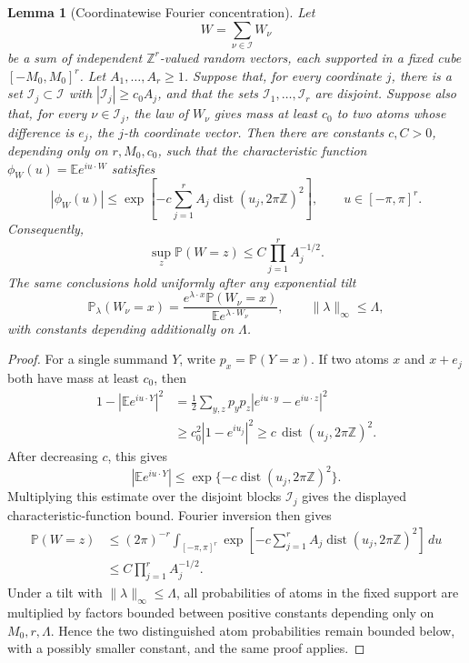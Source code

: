 \documentclass[11pt]{article}
\newtheorem{lemma}[theorem]{Lemma}
\theoremstyle{remark}
\newcommand{\Pp}{\mathbb P}
\newcommand{\Ee}{\mathbb E}
\newcommand{\dd}{\,d}
\begin{document}
\begin{lemma}[Coordinatewise Fourier concentration]\label{lem:coord-fourier}
Let
\[
        W=\sum_{\nu\in\mathcal I}W_\nu
\]
be a sum of independent \(\mathbb Z^r\)-valued random vectors, each supported in a fixed cube \([-M_0,M_0]^r\).  Let
\(A_1,\ldots,A_r\ge1\).  Suppose that, for every coordinate \(j\), there is a set
\(\mathcal I_j\subset\mathcal I\) with
\(|\mathcal I_j|\ge c_0A_j\), and that the sets
\(\mathcal I_1,\ldots,\mathcal I_r\) are disjoint.  Suppose also that, for every
\(\nu\in\mathcal I_j\), the law of \(W_\nu\) gives mass at least \(c_0\) to two atoms whose difference is \(e_j\), the \(j\)-th coordinate vector.  Then there are constants
\(c,C>0\), depending only on \(r,M_0,c_0\), such that the characteristic function
\(\phi_W(u)=\Ee e^{iu\cdot W}\) satisfies
\[
        |\phi_W(u)|
        \le \exp\left[-c\sum_{j=1}^r
        A_j\operatorname{dist}(u_j,2\pi\mathbb Z)^2\right],
        \qquad u\in[-\pi,\pi]^r.
\]
Consequently,
\[
        \sup_z\Pp(W=z)\le C\prod_{j=1}^r A_j^{-1/2}.
\]
The same conclusions hold uniformly after any exponential tilt
\[
        \Pp_\lambda(W_\nu=x)
        =\frac{e^{\lambda\cdot x}\Pp(W_\nu=x)}
        {\Ee e^{\lambda\cdot W_\nu}},
        \qquad \|\lambda\|_\infty\le \Lambda,
\]
with constants depending additionally on \(\Lambda\).
\end{lemma}

\begin{proof}
For a single summand \(Y\), write \(p_x=\Pp(Y=x)\).  If two atoms
\(x\) and \(x+e_j\) both have mass at least \(c_0\), then
\[
\begin{aligned}
        1-|\Ee e^{iu\cdot Y}|^2
        &=\frac12\sum_{y,z}p_yp_z
        |e^{iu\cdot y}-e^{iu\cdot z}|^2  \\
        &\ge c_0^2 |1-e^{iu_j}|^2
        \ge c\,\operatorname{dist}(u_j,2\pi\mathbb Z)^2 .
\end{aligned}\]
After decreasing \(c\), this gives
\[
        |\Ee e^{iu\cdot Y}|
        \le \exp\{-c\operatorname{dist}(u_j,2\pi\mathbb Z)^2\}.
\]
Multiplying this estimate over the disjoint blocks \(\mathcal I_j\) gives the displayed characteristic-function bound.  Fourier inversion then gives
\[
\begin{aligned}
        \Pp(W=z)
        &\le (2\pi)^{-r}\int_{[-\pi,\pi]^r}
        \exp\left[-c\sum_{j=1}^r
        A_j\operatorname{dist}(u_j,2\pi\mathbb Z)^2\right]\dd u \\
        &\le C\prod_{j=1}^r A_j^{-1/2}.
\end{aligned}
\]
Under a tilt with \(\|\lambda\|_\infty\le\Lambda\), all probabilities of atoms in the fixed support are multiplied by factors bounded between positive constants depending only on \(M_0,r,\Lambda\).  Hence the two distinguished atom probabilities remain bounded below, with a possibly smaller constant, and the same proof applies.
\end{proof}
\end{document}
